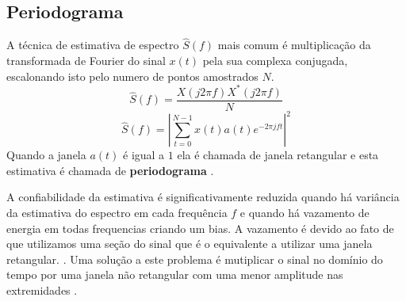 \subsection{Periodograma}
A t\'ecnica de estimativa de espectro $\hat{S}(f)$ mais comum \'e multiplica\c{c}\~ao da transformada de Fourier do sinal $x(t)$ pela sua complexa conjugada, escalonando isto pelo numero de pontos amostrados $N$\cite{PMTM}. 
\begin{equation}
\hat{S}(f)= \frac{X(j2\pi f)  X^{*}(j2\pi f)}{N}
\end{equation}
\begin{equation}\label{eq:winPSD}	
\hat{S}(f)= {\left| \sum_{t=0}^{N-1} x(t) a(t) e^{-2\pi j f t }\right|}^{2} 
\end{equation}
Quando a janela $a(t)$ \'e igual a $1$ ela \'e chamada de janela retangular e esta estimativa \'e chamada de\textbf{ periodograma} \cite{PMTM}.
\par
A confiabilidade da estimativa \'e significativamente reduzida quando h\'a vari\^ancia da estimativa do espectro em cada frequ\^encia $f$ e quando h\'a vazamento de energia em todas frequencias criando um bias\cite{PMTM}.
A vazamento \'e devido ao fato de que utilizamos uma se\c{c}\~ao do sinal que \'e o equivalente a utilizar uma janela retangular.
\cite{PMTM}.
Uma solu\c{c}\~ao a este problema \'e mutiplicar o sinal no dom\'inio do tempo por uma janela n\~ao retangular com uma menor amplitude nas extremidades \cite{PMTM}.
